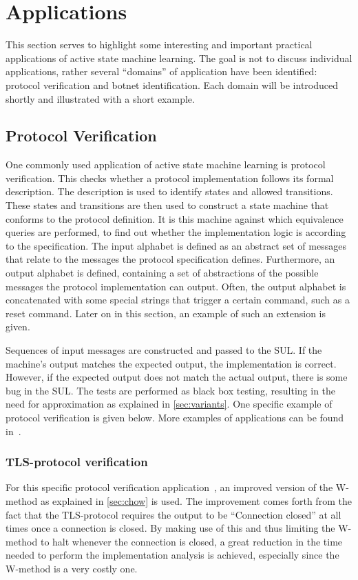 \section{Applications}
\label{sec:applications}

This section serves to highlight some interesting and important practical
applications of active state machine learning. The goal is not to discuss
individual applications, rather several ``domains'' of application have been
identified: protocol verification and  botnet identification.
Each domain will be introduced shortly and illustrated with a short example.

\subsection{Protocol Verification}
One commonly used application of active state machine learning is
protocol verification. This checks whether a protocol implementation follows
its formal description. The description is used to identify states and
allowed transitions. These states and transitions are then used to construct a
state machine that conforms to the protocol definition. It is this machine
against which equivalence queries are performed, to find out whether the
implementation logic is according to the specification. The input alphabet
is defined as an abstract set of messages that relate to the messages the
protocol specification defines. Furthermore, an output alphabet is defined,
containing a set of abstractions of the possible messages the protocol
implementation can output. Often, the output alphabet is concatenated with
some special strings that trigger a certain command, such as a reset command.
Later on in this section, an example of such an extension is given.

Sequences of input messages are constructed and passed to the SUL. If the
machine's output matches the expected output, the implementation is correct.
However, if the expected output does not match the actual output, there is
some bug in the SUL. The tests are performed as black box testing, resulting
in the need for approximation as explained in \cref{sec:variants}. One specific
example of protocol verification is given below. More examples of applications
can be found in~\cite{Aarts2013,Cho2010,Aarts2010}.

\subsubsection{TLS-protocol verification} For this specific protocol verification
application~\cite{deRuiter2015}, an improved version of the W-method as explained
in \cref{sec:chow} is used. The improvement comes forth from the fact that the
TLS-protocol requires the output to be ``Connection closed'' at all times once a
connection is closed. By making use of this and thus limiting the W-method to
halt whenever the connection is closed, a great reduction in the time needed to
perform the implementation analysis is achieved, especially since the W-method is
a very costly one.

